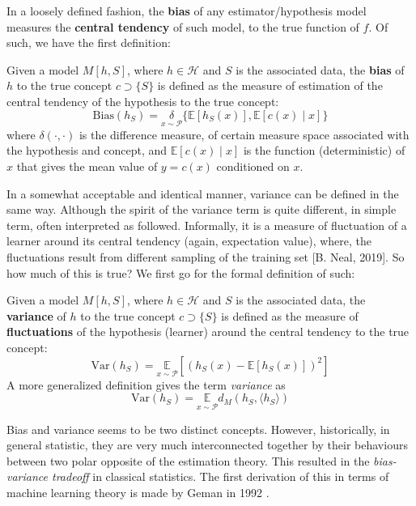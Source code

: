 In a loosely defined fashion, the \textbf{bias} of any estimator/hypothesis model measures the \textbf{central tendency} of such model, to the true function of $f$. Of such, we have the first definition: 
\begin{definition}[Bias, I]
  Given a model $M[h,S]$, where $h\in\mathcal{H}$ and $S$ is the associated data, the \textbf{bias} of $h$ to the true concept $c\supset \{S\}$ is defined as the measure of estimation of the central tendency of the hypothesis to the true concept: \begin{equation}
    \mathrm{Bias}(h_S) = \underset{x\sim \mathcal{P}}{\delta}\{ \mathbb{E}[h_S (x)] ,\mathbb{E} [c(x)\mid x]  \}
  \end{equation} 
  where $\delta(\cdot, \cdot)$ is the difference measure, of certain measure space associated with the hypothesis and concept, and $\mathbb{E}[c(x)\mid x]$ is the function (deterministic) of $x$ that gives the mean value of $y=c(x)$ conditioned on $x$. 
\end{definition}

In a somewhat acceptable and identical manner, variance can be defined in the same way. Although the spirit of the variance term is quite different, in simple term, often interpreted as followed. Informally, it is a measure of fluctuation of a learner around its central tendency (again, expectation value), where, the fluctuations result from different sampling of the training set [B. Neal, 2019]. So how much of this is true? We first go for the formal definition of such: 

\begin{definition}[Variance, I]
  Given a model $M[h,S]$, where $h\in\mathcal{H}$ and $S$ is the associated data, the \textbf{variance} of $h$ to the true concept $c\supset \{S\}$ is defined as the measure of \textbf{fluctuations} of the hypothesis (learner) around the central tendency to the true concept: 
  \begin{equation}
    \mathrm{Var}(h_S) = \underset{x\sim \mathcal{P}}{\mathbb{E}} \left[ (h_S(x) - \mathbb{E} [h_S (x)])^{2} \right] 
  \end{equation}
  A more generalized definition gives the term \textit{variance} as \begin{equation}
    \mathrm{Var}(h_S) = \underset{x\sim \mathcal{P}}{\mathbb{E}} d_{M} (h_S, \langle h_S \rangle) 
  \end{equation}
\end{definition}
Bias and variance seems to be two distinct concepts. However, historically, in general statistic, they are very much interconnected together by their behaviours between two polar opposite of the estimation theory. This resulted in the \textit{bias-variance tradeoff} in classical statistics. The first derivation of this in terms of machine learning theory is made by Geman in 1992 \cite{6797087}.
